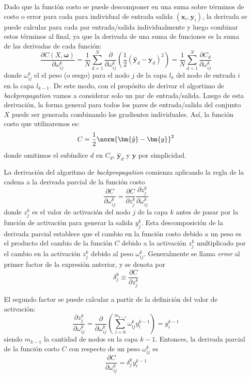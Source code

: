 Dado que la función costo se puede descomponer en una suma sobre términos de costo o error para cada para individual de entrada salida $(\bm{x}_i, \bm{y}_i)$, la derivada se puede calcular para cada par entrada/salida individualmente y luego combinar estos términos al final, ya que la derivada de una suma de funciones es la suma de las derivadas de cada función:
\[ \frac{\partial C(X, \bm{\omega})}{\partial \omega_{ij}^k} = \frac{1}{N} \sum_{d=1}^N \frac{\partial}{\partial \omega_{ij}^k} \left(\dfrac{1}{2}(\bm{\hat{y}}_d - \bm{y}_d)^2\right) = \frac{1}{N} \sum_{d=1}^N \frac{\partial C_d}{\partial \omega_{ij}^k} \]
donde $\omega_{ij}^k$ el el peso (o sesgo) para el nodo $j$ de la capa $l_k$ del nodo de entrada $i$ en la capa $l_{k-1}$. De este modo, con el propósito de derivar el algortimo de \textit{backpropagation} vamos a considerar solo un par de entrada/salida. Luego de esta derivación, la forma general para todos los pares de entrada/salida del conjunto $X$ puede ser generada combinando los gradientes individuales. Así, la función costo que utilizaremos es:
\[ C = \frac{1}{2}\norm{\bm{\hat{y}} - \bm{y}}^2 \]
donde omitimos el subíndice $d$ en $C_d$, $\bm{\hat{y}}_d$ y $\bm{y}$ por simplicidad.

La derivación del algoritmo de \textit{backpropagation} comienza aplicando la regla de la cadena a la derivada parcial de la función costo
\[ \frac{\partial C}{\partial \omega_{ij}^k} = \frac{\partial C}{\partial z_j^k} \frac{\partial z_j^k}{\partial \omega_{ij}^k} \]
donde $z_j^k$ es el valor de activación del nodo $j$ de la capa $k$ antes de pasar por la función de activación para generar la salida $y_j^k$. Esta descomposición de la derivada parcial establece que el cambio en la función costo debido a un peso es el producto del cambio de la función $C$ debido a la activación $z_j^k$ multiplicado por el cambio en la activación $z_j^k$ debido al peso $\omega_{ij}^k$. Generalmente se llama \textit{error} al primer factor de la expresión anterior, y se denota por
\[ \delta_j^k \equiv \frac{\partial C}{\partial z_j^k} \]

El segundo factor se puede calcular a partir de la definición del valor de activación:
\[ \frac{\partial z_j^k}{\partial \omega_{ij}^k} = \frac{\partial}{\partial \omega_{ij}^k} \left(\sum_{l=0}^{m_{k-1}} \omega_{lj}^k y_l^{k-1}\right) = y_i^{k-1} \]
siendo $m_{k-1}$ la cantidad de nodos en la capa $k-1$. Entonces, la derivada parcial de la función costo $C$ con respecto de un peso $\omega_{ij}^k$ es 
\[ \frac{\partial C}{\partial \omega_{ij}^k} = \delta_j^k y_i^{k-1} \]

